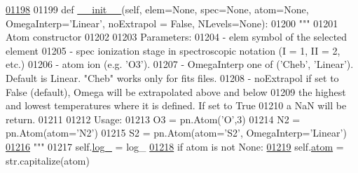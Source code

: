\begin{DoxyCode}
\hypertarget{classpyneb_1_1core_1_1pynebcore_1_1_atom_l01198}{}\hyperlink{classpyneb_1_1core_1_1pynebcore_1_1_atom_ad92916e464a9e193eb3e49b84f253a35}{01198} 
01199     \textcolor{keyword}{def }\hyperlink{classpyneb_1_1core_1_1pynebcore_1_1_atom_ad92916e464a9e193eb3e49b84f253a35}{\_\_init\_\_}(self, elem=None, spec=None, atom=None, OmegaInterp='Linear', noExtrapol = False, 
      NLevels=None):
01200         \textcolor{stringliteral}{"""}
01201 \textcolor{stringliteral}{        Atom constructor}
01202 \textcolor{stringliteral}{        }
01203 \textcolor{stringliteral}{        Parameters:}
01204 \textcolor{stringliteral}{            - elem          symbol of the selected element}
01205 \textcolor{stringliteral}{            - spec          ionization stage in spectroscopic notation (I = 1, II = 2, etc.)}
01206 \textcolor{stringliteral}{            - atom          ion (e.g. 'O3').}
01207 \textcolor{stringliteral}{            - OmegaInterp   one of ('Cheb', 'Linear'). Default is Linear. "Cheb" works only for fits files.
       }
01208 \textcolor{stringliteral}{            - noExtrapol    if set to False (default), Omega will be extrapolated above and below}
01209 \textcolor{stringliteral}{                            the highest and lowest temperatures where it is defined. If set to True}
01210 \textcolor{stringliteral}{                            a NaN will be return.}
01211 \textcolor{stringliteral}{            }
01212 \textcolor{stringliteral}{        Usage:}
01213 \textcolor{stringliteral}{            O3 = pn.Atom('O',3)}
01214 \textcolor{stringliteral}{            N2 = pn.Atom(atom='N2')}
01215 \textcolor{stringliteral}{            S2 = pn.Atom(atom='S2', OmegaInterp='Linear')}
\hypertarget{classpyneb_1_1core_1_1pynebcore_1_1_atom_l01216}{}\hyperlink{classpyneb_1_1core_1_1pynebcore_1_1_atom_a9e2e5b5402bb9cf14c1b08684bccbf6b}{01216} \textcolor{stringliteral}{        """}        
01217         self.\hyperlink{classpyneb_1_1core_1_1pynebcore_1_1_atom_a9e2e5b5402bb9cf14c1b08684bccbf6b}{log\_} = log\_
\hypertarget{classpyneb_1_1core_1_1pynebcore_1_1_atom_l01218}{}\hyperlink{classpyneb_1_1core_1_1pynebcore_1_1_atom_a192f3e20446d7fba81d789bc705d6c71}{01218}         \textcolor{keywordflow}{if} atom \textcolor{keywordflow}{is} \textcolor{keywordflow}{not} \textcolor{keywordtype}{None}:
\hypertarget{classpyneb_1_1core_1_1pynebcore_1_1_atom_l01219}{}\hyperlink{classpyneb_1_1core_1_1pynebcore_1_1_atom_ae722bd0e35e1c8cdc0018d56c34171cf}{01219}             self.\hyperlink{classpyneb_1_1core_1_1pynebcore_1_1_atom_a192f3e20446d7fba81d789bc705d6c71}{atom} = str.capitalize(atom)

\end{DoxyCode}
